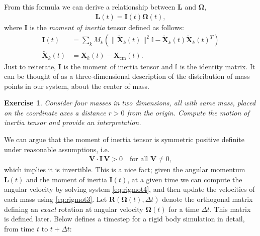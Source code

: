 \documentclass[10pt]{article}
\newtheorem{myexer}{Exercise}
\newcommand{\bs}[1]{{\boldsymbol #1}}
\begin{document}
From this formula we can derive a relationship between ${\bs L}$ and ${\bs \Omega}$,
\begin{align}
\label{eq:rigmot4}
{\bs L}(t) = {\bs I}(t) {\bs \Omega}(t),
\end{align}
where ${\bs I}$ is the {\em moment of inertia} tensor defined as follows:
\begin{align*}
{\bs I}(t) &= \sum_k M_k \left( \| \tilde{{\bs X}}_k(t) \|^2 \mathbb{I} - \tilde{{\bs X}}_k(t) \tilde{{\bs X}}_k(t)^T \right) \\
\tilde{{\bs X}}_k(t) &= {\bs X}_k(t) - {\bs X}_\text{cm}(t).
\end{align*}
Just to reiterate, ${\bs I}$ is the moment of inertia tensor and $\mathbb{I}$ is the identity matrix.  It can be thought of as a three-dimensional description of the distribution of mass points in our system, about the center of mass.
\begin{myexer}
Consider four masses in two dimensions, all with same mass, placed on the coordinate axes a distance $r > 0$ from the origin.  Compute the motion of inertia tensor and provide an interpretation.
\end{myexer}
We can argue that the moment of inertia tensor is symmetric positive definite under reasonable assumptions, i.e.
\begin{align*}
{\bs V} \cdot {\bs I}\, {\bs V} > 0 \quad \text{for all }{\bs V} \neq 0,
\end{align*}
which implies it is invertible.  This is a nice fact; given the angular momentum ${\bs L}(t)$ and the moment of inertia ${\bs I}(t)$, at a given time we can compute the angular velocity by solving system \eqref{eq:rigmot4}, and then update the velocities of each mass using \eqref{eq:rigmot3}.  Let ${\bs R}({\bs \Omega}(t),\Delta t)$ denote the orthogonal matrix defining an {\em exact} rotation at angular velocity ${\bs \Omega}(t)$ for a time $\Delta t$.  This matrix is defined later.  Below defines a timestep for a rigid body simulation in detail, from time $t$ to $t + \Delta t$:
\end{document}
